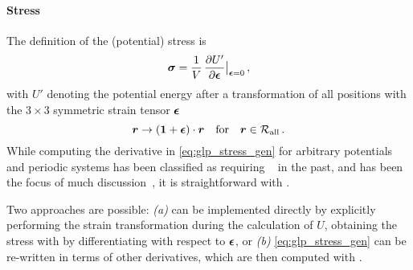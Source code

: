 \paragraph{Stress} The definition of the (potential) stress is~\cite{kcbs2015t}
\begin{equation}
    \stress = \frac{1}{V} \, \frac{\partial U'}{\partial \strain}{\big |}_{\strain = 0} \, , \label{eq:glp_stress_gen}
\end{equation}
with $U'$ denoting the potential energy after a transformation of all positions with the $3\times3$ symmetric strain tensor $\boldsymbol{\epsilon}$
\begin{equation}
    \boldsymbol{r} \rightarrow ({\bf 1} + \boldsymbol{\epsilon}) \cdot \boldsymbol{r} \quad \text{for} \quad \boldsymbol{r} \in \mathcal{R_{\text{all}}} \, .
\end{equation}
While computing the derivative in \cref{eq:glp_stress_gen} for arbitrary potentials and periodic systems has been classified as requiring ~\cite{lb2006p} in the past, and has been the focus of much discussion~\cite{tpm2009t,at2011t}, it is straightforward with \ad.

Two approaches are possible: \emph{(a)}  can be implemented directly by explicitly performing the strain transformation during the calculation of $U$, obtaining the stress with \ad by differentiating with respect to $\boldsymbol{\epsilon}$, or \emph{(b)} \cref{eq:glp_stress_gen} can be re-written in terms of other derivatives, which are then computed with \ad.


